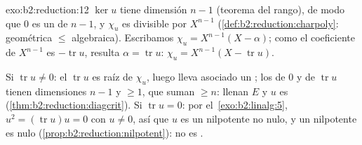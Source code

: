 \begin{solution}{exo:b2:reduction:12}
$\ker u$ tiene dimensión $n - 1$ (teorema del rango), de modo que $0$
es un  de  $n - 1$, y
$\chi_u$ es divisible por $X^{n-1}$
(\cref{def:b2:reduction:charpoly}: geométrica $\leq$ algebraica).
Escribamos $\chi_u = X^{n-1}(X - \alpha)$; como el coeficiente de
$X^{n-1}$ es $-\operatorname{tr} u$, resulta $\alpha =
\operatorname{tr} u$: $\chi_u = X^{n-1}(X - \operatorname{tr} u)$.

Si $\operatorname{tr} u \neq 0$: el  $\operatorname{tr}
u$ es raíz de $\chi_u$, luego lleva asociado un ; los
 de $0$ y de $\operatorname{tr} u$ tienen
dimensiones $n - 1$ y $\geq 1$, que suman $\geq n$: llenan $E$ y $u$
es  (\cref{thm:b2:reduction:diagcrit}). Si
$\operatorname{tr} u = 0$: por el~\cref{exo:b2:linalg:5}, $u^2 =
(\operatorname{tr} u)u = 0$ con $u \neq 0$, así que $u$ es un
nilpotente no nulo, y un nilpotente  es nulo
(\cref{prop:b2:reduction:nilpotent}): no es .
\end{solution}

